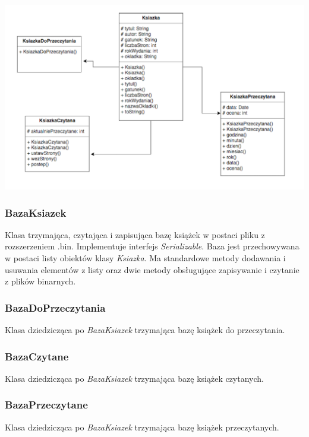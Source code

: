 \documentclass[a4paper,10pt]{article}
\begin{document}
\begin{enumerate}
\begin{center}
\includegraphics[scale=0.18]{UML1.png}
\end{center}

\subsubsection{BazaKsiazek}
Klasa trzymająca, czytająca i zapisująca bazę książek w postaci pliku z rozszerzeniem .bin. Implementuje interfejs \textit{Serializable}. Baza jest przechowywana w postaci listy obiektów klasy \textit{Ksiazka}. Ma standardowe metody dodawania i usuwania elementów z listy oraz dwie metody obsługujące zapisywanie i czytanie z plików binarnych.

\subsubsection{BazaDoPrzeczytania}
Klasa dziedzicząca po \textit{BazaKsiazek} trzymająca bazę książek do przeczytania.

\subsubsection{BazaCzytane}
Klasa dziedzicząca po \textit{BazaKsiazek} trzymająca bazę książek czytanych.

\subsubsection{BazaPrzeczytane}
Klasa dziedzicząca po \textit{BazaKsiazek} trzymająca bazę książek przeczytanych.


\end{enumerate}
\end{document}
